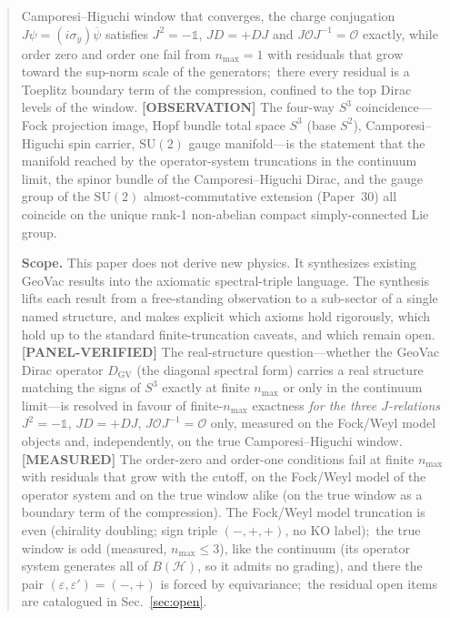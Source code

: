 \documentclass[11pt]{article}
\providecommand{\sthree}{S^3}
\begin{document}
\begin{abstract}
Camporesi--Higuchi window that converges, the charge conjugation
$J\psi = (i\sigma_y)\overline{\psi}$ satisfies $J^2 = -\mathbb{1}$,
$JD = +DJ$ and $J\mathcal{O}J^{-1} = \mathcal{O}$ exactly, while order
zero and order one fail from $n_{\max} = 1$ with residuals that grow
toward the sup-norm scale of the generators;\ there every residual is
a Toeplitz boundary term of the compression, confined to the top Dirac
levels of the window.
\textbf{[OBSERVATION]} The four-way $S^3$ coincidence---Fock projection image,
Hopf bundle total space $\sthree$ (base $S^2$), Camporesi--Higuchi spin carrier,
$\mathrm{SU}(2)$ gauge manifold---is the statement that the manifold
reached by the operator-system truncations in the continuum limit, the
spinor bundle of the Camporesi--Higuchi Dirac, and the gauge group of
the $\mathrm{SU}(2)$ almost-commutative extension (Paper~30) all
coincide on the unique rank-1 non-abelian compact simply-connected Lie
group.

\noindent\textbf{Scope.}  This paper does not derive new physics.  It
synthesizes existing GeoVac results into the axiomatic spectral-triple
language.  The synthesis lifts each result from a free-standing
observation to a sub-sector of a single named structure, and makes
explicit which axioms hold rigorously, which hold up to the standard
finite-truncation caveats, and which remain open.  \textbf{[PANEL-VERIFIED]}
The real-structure question---whether the GeoVac Dirac operator $D_{\mathrm{GV}}$ (the diagonal spectral form) carries a real
structure matching the signs of $S^3$ exactly at finite $n_{\max}$ or
only in the continuum limit---is resolved in favour of
finite-$n_{\max}$ exactness \emph{for the three $J$-relations}
$J^2 = -\mathbb{1}$, $JD = +DJ$, $J\mathcal{O}J^{-1} = \mathcal{O}$
only, measured on the Fock/Weyl model objects and, independently, on
the true Camporesi--Higuchi window.  \textbf{[MEASURED]}
The order-zero and order-one conditions fail at finite $n_{\max}$ with
residuals that grow with the cutoff, on the Fock/Weyl model of the
operator system and on the true window alike (on the true window as a
boundary term of the compression).  The Fock/Weyl model truncation is
even (chirality doubling; sign triple $(-,+,+)$, no $\mathrm{KO}$
label);\ the true window is odd (measured, $n_{\max} \le 3$), like
the continuum (its operator system generates all of $B(\mathcal{H})$,
so it admits no grading), and
there the pair $(\varepsilon, \varepsilon') = (-,+)$ is forced by
equivariance;\ the residual open
items are catalogued in Sec.~\ref{sec:open}.
\end{abstract}
\end{document}
